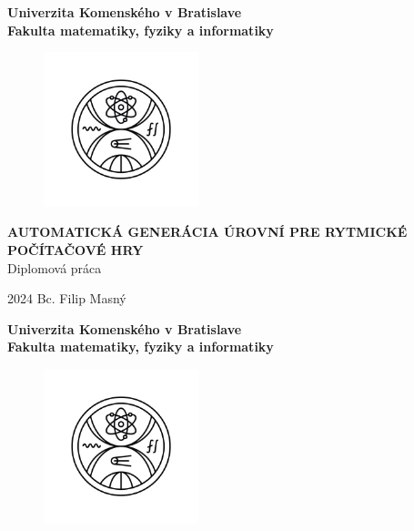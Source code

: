 \documentclass[12pt, twoside, openany]{book}
\def\mfrok{2024}
\def\mftitle{Automatická Generácia Úrovní pre Rytmické Počítačové Hry}
\def\mfthesistype{Diplomová práca}
\def\mfauthor{Bc. Filip Masný}
\def\mfuniversity{Univerzita Komenského v Bratislave }
\def\mffaculty{Fakulta matematiky, fyziky a informatiky}
\begin{document}
\frontmatter


\thispagestyle{empty}

\noindent
\begin{minipage}{\textwidth}
    \begin{center}
        \textbf{\mfuniversity \\
            \mffaculty}
    \end{center}
\end{minipage}

\vfill
\begin{figure}[!hbt]
    \begin{center}
        \includegraphics[width=0.4\textwidth]{images/FMFI_logo_BP.png}\label{img:logo}
    \end{center}
\end{figure}
\begin{center}
    \textbf{\MakeUppercase{\Large\mftitle}}\\
    \mfthesistype
\end{center}
\vfill
\mfrok \hfill
\mfauthor
\cleardoublepage



\thispagestyle{empty}
\noindent
\begin{minipage}{\textwidth}
    \begin{center}
        \textbf{\mfuniversity \\
            \mffaculty}
    \end{center}
\end{minipage}

\vfill
\begin{figure}[!hbt]
    \begin{center}
        \includegraphics[width=0.4\textwidth]{images/FMFI_logo_BP.png}\label{img:logo_dark}
    \end{center}
\end{figure}
\end{document}
